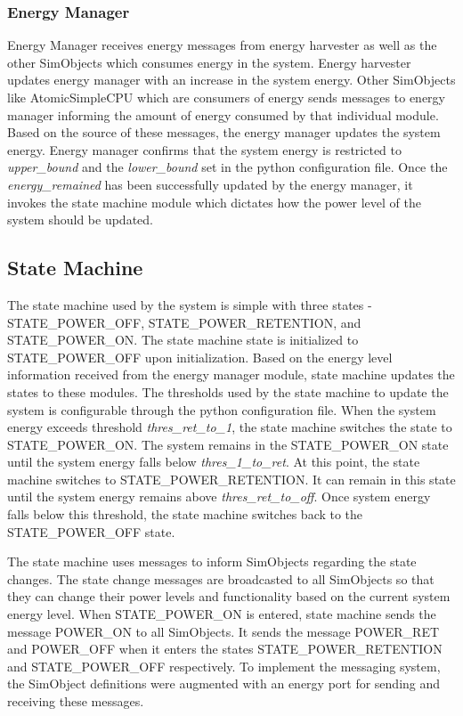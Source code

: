 \documentclass[conference]{IEEEtran}
\begin{document}
\subsubsection{Energy Manager}
Energy Manager receives energy messages from energy harvester as well as the other SimObjects which consumes energy in the system. Energy harvester updates energy manager with an increase in the system energy. Other SimObjects like AtomicSimpleCPU which are consumers of energy sends messages to energy manager informing the amount of energy consumed by that individual module. Based on the source of these messages, the energy manager updates the system energy. Energy manager confirms that the system energy is restricted to \textit{upper\_bound} and the \textit{lower\_bound} set in the python configuration file. Once the \textit{energy\_remained} has been successfully updated by the energy manager, it invokes the state machine module which dictates how the power level of the system should be updated. 

\subsection{State Machine}
The state machine used by the system is simple with three states - STATE\_POWER\_OFF, STATE\_POWER\_RETENTION, and STATE\_POWER\_ON. The state machine state is initialized to STATE\_POWER\_OFF upon initialization. Based on the energy level information received from the energy manager module, state machine updates the states to these modules. The thresholds used by the state machine to update the system is configurable through the python configuration file. When the system energy exceeds threshold \textit{thres\_ret\_to\_1}, the state machine switches the state to STATE\_POWER\_ON. The system remains in the STATE\_POWER\_ON state until the system energy falls below  \textit{thres\_1\_to\_ret}. At this point, the state machine switches to STATE\_POWER\_RETENTION. It can remain in this state until the system energy remains above \textit{thres\_ret\_to\_off}. Once system energy falls below this threshold, the state machine switches back to the STATE\_POWER\_OFF state.

The state machine uses messages to inform SimObjects regarding the state changes. The state change messages are broadcasted to all SimObjects so that they can change their power levels and functionality based on the current system energy level. When STATE\_POWER\_ON is entered, state machine sends the message POWER\_ON to all SimObjects. It sends the message POWER\_RET and POWER\_OFF when it enters the states STATE\_POWER\_RETENTION and STATE\_POWER\_OFF respectively. To implement the messaging system, the SimObject definitions were augmented with an energy port for sending and receiving these messages. 
\end{document}
